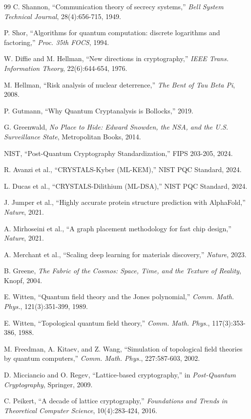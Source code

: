 \documentclass[11pt,a4paper]{article}
\begin{document}
\begin{thebibliography}{99}
 C. Shannon, ``Communication theory of secrecy systems,'' \textit{Bell System Technical Journal}, 28(4):656-715, 1949.

 P. Shor, ``Algorithms for quantum computation: discrete logarithms and factoring,'' \textit{Proc. 35th FOCS}, 1994.

 W. Diffie and M. Hellman, ``New directions in cryptography,'' \textit{IEEE Trans. Information Theory}, 22(6):644-654, 1976.

 M. Hellman, ``Risk analysis of nuclear deterrence,'' \textit{The Bent of Tau Beta Pi}, 2008.

 P. Gutmann, ``Why Quantum Cryptanalysis is Bollocks,'' 2019.

 G. Greenwald, \textit{No Place to Hide: Edward Snowden, the NSA, and the U.S. Surveillance State}, Metropolitan Books, 2014.

 NIST, ``Post-Quantum Cryptography Standardization,'' FIPS 203-205, 2024.

 R. Avanzi et al., ``CRYSTALS-Kyber (ML-KEM),'' NIST PQC Standard, 2024.

 L. Ducas et al., ``CRYSTALS-Dilithium (ML-DSA),'' NIST PQC Standard, 2024.

 J. Jumper et al., ``Highly accurate protein structure prediction with AlphaFold,'' \textit{Nature}, 2021.

 A. Mirhoseini et al., ``A graph placement methodology for fast chip design,'' \textit{Nature}, 2021.

 A. Merchant et al., ``Scaling deep learning for materials discovery,'' \textit{Nature}, 2023.

 B. Greene, \textit{The Fabric of the Cosmos: Space, Time, and the Texture of Reality}, Knopf, 2004.

 E. Witten, ``Quantum field theory and the Jones polynomial,'' \textit{Comm. Math. Phys.}, 121(3):351-399, 1989.

 E. Witten, ``Topological quantum field theory,'' \textit{Comm. Math. Phys.}, 117(3):353-386, 1988.

 M. Freedman, A. Kitaev, and Z. Wang, ``Simulation of topological field theories by quantum computers,'' \textit{Comm. Math. Phys.}, 227:587-603, 2002.

 D. Micciancio and O. Regev, ``Lattice-based cryptography,'' in \textit{Post-Quantum Cryptography}, Springer, 2009.

 C. Peikert, ``A decade of lattice cryptography,'' \textit{Foundations and Trends in Theoretical Computer Science}, 10(4):283-424, 2016.
\end{thebibliography}
\end{document}
